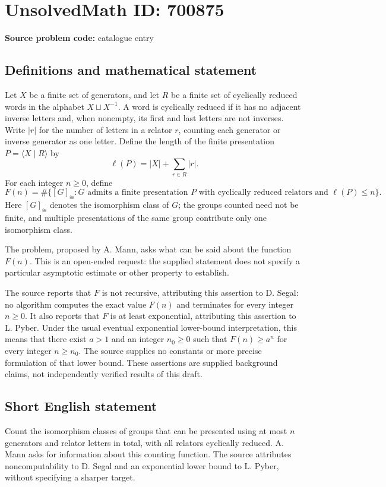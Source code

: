 \documentclass[11pt]{article}
\begin{document}
\section*{UnsolvedMath ID: 700875}
\textbf{Source problem code:} catalogue entry
\subsection{Definitions and mathematical statement}
Let \(X\) be a finite set of generators, and let \(R\) be a finite set of cyclically reduced words in the alphabet \(X\sqcup X^{-1}\). A word is cyclically reduced if it has no adjacent inverse letters and, when nonempty, its first and last letters are not inverses. Write \(|r|\) for the number of letters in a relator \(r\), counting each generator or inverse generator as one letter. Define the length of the finite presentation \(P=\langle X\mid R\rangle\) by
\[
\ell(P)=|X|+\sum_{r\in R}|r|.
\]
For each integer \(n\geq 0\), define
\[
F(n)=\#\bigl\{[G]_{\cong}:G\text{ admits a finite presentation }P\text{ with cyclically reduced relators and }\ell(P)\leq n\bigr\}.
\]
Here \([G]_{\cong}\) denotes the isomorphism class of \(G\); the groups counted need not be finite, and multiple presentations of the same group contribute only one isomorphism class.

The problem, proposed by A. Mann, asks what can be said about the function \(F(n)\). This is an open-ended request: the supplied statement does not specify a particular asymptotic estimate or other property to establish.

The source reports that \(F\) is not recursive, attributing this assertion to D. Segal: no algorithm computes the exact value \(F(n)\) and terminates for every integer \(n\geq0\). It also reports that \(F\) is at least exponential, attributing this assertion to L. Pyber. Under the usual eventual exponential lower-bound interpretation, this means that there exist \(a>1\) and an integer \(n_0\geq0\) such that \(F(n)\geq a^n\) for every integer \(n\geq n_0\). The source supplies no constants or more precise formulation of that lower bound. These assertions are supplied background claims, not independently verified results of this draft.
\subsection{Short English statement}
Count the isomorphism classes of groups that can be presented using at most \(n\) generators and relator letters in total, with all relators cyclically reduced. A. Mann asks for information about this counting function. The source attributes noncomputability to D. Segal and an exponential lower bound to L. Pyber, without specifying a sharper target.
\end{document}
